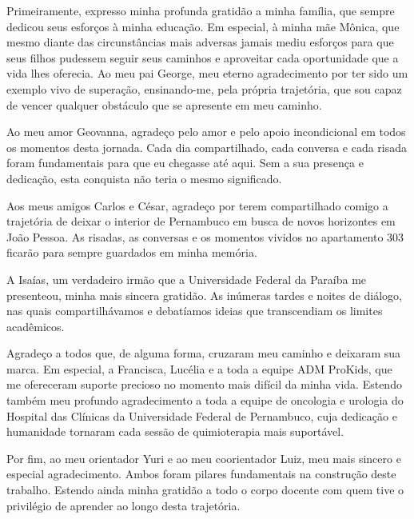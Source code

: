 \setlength{\parindent}{1.25cm}

Primeiramente, expresso minha profunda gratidão a minha família, que sempre dedicou seus esforços à minha educação. Em especial, à minha mãe Mônica, que mesmo diante das circunstâncias mais adversas jamais mediu esforços para que seus filhos pudessem seguir seus caminhos e aproveitar cada oportunidade que a vida lhes oferecia. Ao meu pai George, meu eterno agradecimento por ter sido um exemplo vivo de superação, ensinando-me, pela própria trajetória, que sou capaz de vencer qualquer obstáculo que se apresente em meu caminho. 

Ao meu amor Geovanna, agradeço pelo amor e pelo apoio incondicional em todos os momentos desta jornada. Cada dia compartilhado, cada conversa e cada risada foram fundamentais para que eu chegasse até aqui. Sem a sua presença e dedicação, esta conquista não teria o mesmo significado. 

Aos meus amigos Carlos e César, agradeço por terem compartilhado comigo a trajetória de deixar o interior de Pernambuco em busca de novos horizontes em João Pessoa. As risadas, as conversas e os momentos vividos no apartamento 303 ficarão para sempre guardados em minha memória. 

A Isaías, um verdadeiro irmão que a Universidade Federal da Paraíba me presenteou, minha mais sincera gratidão. As inúmeras tardes e noites de diálogo, nas quais compartilhávamos e debatíamos ideias que transcendiam os limites acadêmicos. 

Agradeço a todos que, de alguma forma, cruzaram meu caminho e deixaram sua marca. Em especial, a Francisca, Lucélia e a toda a equipe ADM ProKids, que me ofereceram suporte precioso no momento mais difícil da minha vida. Estendo também meu profundo agradecimento a toda a equipe de oncologia e urologia do Hospital das Clínicas da Universidade Federal de Pernambuco, cuja dedicação e humanidade tornaram cada sessão de quimioterapia mais suportável. 

Por fim, ao meu orientador Yuri e ao meu coorientador Luiz, meu mais sincero e especial agradecimento. Ambos foram pilares fundamentais na construção deste trabalho. Estendo ainda minha gratidão a todo o corpo docente com quem tive o privilégio de aprender ao longo desta trajetória.
